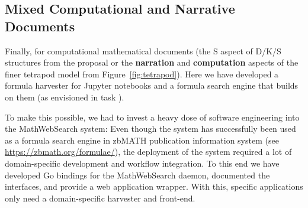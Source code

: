 \subsection{Mixed Computational and Narrative Documents}\label{subsec:software}
Finally, for computational mathematical documents (the S aspect of D/K/S structures from the \pn proposal or the \textbf{narration} and \textbf{computation} aspects of the finer tetrapod model from Figure~\ref{fig:tetrapod}).
Here we have developed a formula harvester for Jupyter notebooks and a formula search engine that builds on them (as envisioned in task ).

To make this possible, we had to invest a heavy dose of software engineering into the MathWebSearch system: Even though the system has successfully been used as a formula search engine in zbMATH publication information system (see \url{https://zbmath.org/formulae/}), the deployment of the system required a lot of domain-specific development and workflow integration.
To this end we have developed Go bindings for the MathWebSearch daemon, documented the interfaces, and provide a web application wrapper.
With this, specific applications only need a domain-specific harvester and front-end. 



